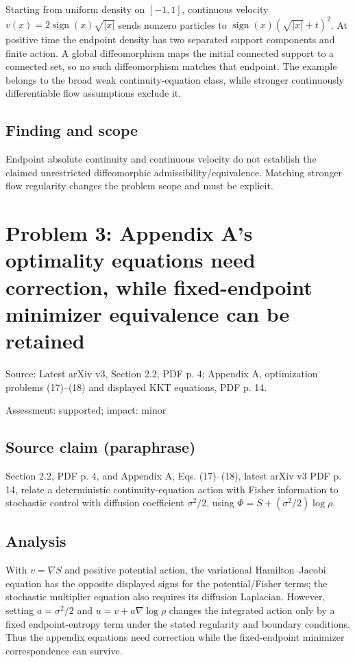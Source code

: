 \documentclass[11pt]{article}
\begin{document}
Starting from uniform density on \([-1,1]\), continuous velocity \(v(x)=2\operatorname{sign}(x)\sqrt{|x|}\) sends nonzero particles to \(\operatorname{sign}(x)(\sqrt{|x|}+t)^2\). At positive time the endpoint density has two separated support components and finite action. A global diffeomorphism maps the initial connected support to a connected set, so no such diffeomorphism matches that endpoint. The example belongs to the broad weak continuity-equation class, while stronger continuously differentiable flow assumptions exclude it.

\subsection*{Finding and scope}

Endpoint absolute continuity and continuous velocity do not establish the claimed unrestricted diffeomorphic admissibility/equivalence. Matching stronger flow regularity changes the problem scope and must be explicit.

\section*{Problem 3: Appendix A’s optimality equations need correction, while fixed-endpoint minimizer equivalence can be retained}

Source: Latest arXiv v3, Section 2.2, PDF p. 4; Appendix A, optimization problems (17)–(18) and displayed KKT equations, PDF p. 14.

Assessment: supported; impact: minor

\subsection*{Source claim (paraphrase)}

Section 2.2, PDF p. 4, and Appendix A, Eqs. (17)–(18), latest arXiv v3 PDF p. 14, relate a deterministic continuity-equation action with Fisher information to stochastic control with diffusion coefficient \(\sigma^2/2\), using \(\Phi=S+(\sigma^2/2)\log\rho\).

\subsection*{Analysis}

With \(v=\nabla S\) and positive potential action, the variational Hamilton–Jacobi equation has the opposite displayed signs for the potential/Fisher terms; the stochastic multiplier equation also requires its diffusion Laplacian. However, setting \(a=\sigma^2/2\) and \(u=v+a\nabla\log\rho\) changes the integrated action only by a fixed endpoint-entropy term under the stated regularity and boundary conditions. Thus the appendix equations need correction while the fixed-endpoint minimizer correspondence can survive.
\end{document}
